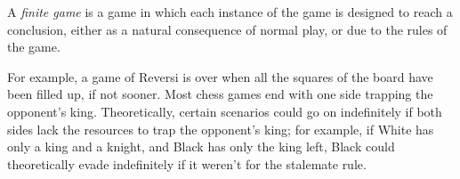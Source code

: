 \documentclass[12pt]{article}
\begin{document}
A {\em finite game} is a game in which each instance of the game is designed to reach a conclusion, either as a natural consequence of normal play, or due to the rules of the game.

For example, a game of Reversi is over when all the squares of the board have been filled up, if not sooner. Most chess games end with one side trapping the opponent's king. Theoretically, certain scenarios could go on indefinitely if both sides lack the resources to trap the opponent's king; for example, if White has only a king and a knight, and Black has only the king left, Black could theoretically evade indefinitely if it weren't for the stalemate rule.
\end{document}
